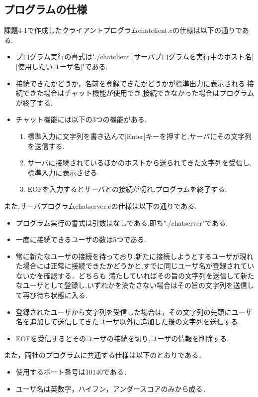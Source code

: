 \documentclass[dvipdfmx]{jarticle}
\begin{document}
\subsection{プログラムの仕様}
課題4-1で作成したクライアントプログラムchatclient.cの仕様は以下の通りである.
\begin{itemize}
    \item プログラム実行の書式は"./chatclient [サーバプログラムを実行中のホスト名] [使用したいユーザ名]"である.
    \item 接続できたかどうか，名前を登録できたかどうかが標準出力に表示される.接続できた場合はチャット機能が使用でき,接続できなかった場合はプログラムが終了する.
    \item チャット機能には以下の3つの機能がある.
    \begin{enumerate}
        \item 標準入力に文字列を書き込んで[Enter]キーを押すと,サーバにその文字列を送信する.
        \item サーバに接続されているほかのホストから送られてきた文字列を受信し,標準入力に表示させる.
        \item EOFを入力するとサーバとの接続が切れ,プログラムを終了する.
    \end{enumerate}
\end{itemize}
また,サーバプログラムchatserver.cの仕様は以下の通りである.
\begin{itemize}
    \item プログラム実行の書式は引数はなしである.即ち"./chatserver"である.
    \item 一度に接続できるユーザの数は5つである.
    \item 常に新たなユーザの接続を待っており,新たに接続しようとするユーザが現れた場合には正常に接続できたかどうかと,すでに同じユーザ名が登録されていないかを確認する．どちらも
    満たしていればその旨の文字列を送信して新たなユーザとして登録し,いずれかを満たさない場合はその旨の文字列を送信して再び待ち状態に入る.
    \item 登録されたユーザから文字列を受信した場合は，その文字列の先頭にユーザ名を追加して送信してきたユーザ以外に追加した後の文字列を送信する.
    \item EOFを受信するとそのユーザの接続を切り,ユーザの情報を削除する.
\end{itemize}
また，両社のプログラムに共通する仕様は以下のとおりである．
\begin{itemize}
    \item 使用するポート番号は10140である．
    \item ユーザ名は英数字，ハイフン，アンダースコアのみから成る．
\end{itemize}
\end{document}
